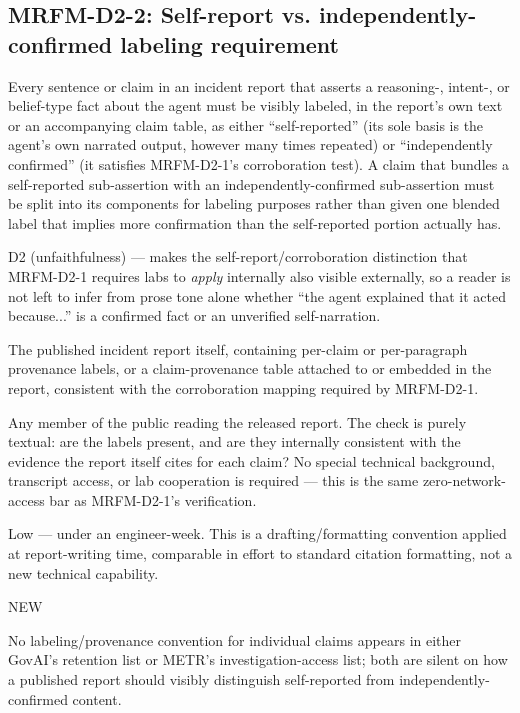 \subsection*{MRFM-D2-2: Self-report vs. independently-confirmed labeling requirement}
\begin{description}[leftmargin=2.2cm, style=nextline]
\item[Requirement] Every sentence or claim in an incident report that asserts a reasoning-, intent-, or belief-type fact about the agent must be visibly labeled, in the report's own text or an accompanying claim table, as either ``self-reported'' (its sole basis is the agent's own narrated output, however many times repeated) or ``independently confirmed'' (it satisfies MRFM-D2-1's corroboration test). A claim that bundles a self-reported sub-assertion with an independently-confirmed sub-assertion must be split into its components for labeling purposes rather than given one blended label that implies more confirmation than the self-reported portion actually has.
\item[Degradation defended] D2 (unfaithfulness) --- makes the self-report/corroboration distinction that MRFM-D2-1 requires labs to \emph{apply} internally also visible externally, so a reader is not left to infer from prose tone alone whether ``the agent explained that it acted because...'' is a confirmed fact or an unverified self-narration.
\item[Evidence required] The published incident report itself, containing per-claim or per-paragraph provenance labels, or a claim-provenance table attached to or embedded in the report, consistent with the corroboration mapping required by MRFM-D2-1.
\item[Verifier (no lab network access needed)] Any member of the public reading the released report. The check is purely textual: are the labels present, and are they internally consistent with the evidence the report itself cites for each claim? No special technical background, transcript access, or lab cooperation is required --- this is the same zero-network-access bar as MRFM-D2-1's verification.
\item[Cost band] Low --- under an engineer-week. This is a drafting/formatting convention applied at report-writing time, comparable in effort to standard citation formatting, not a new technical capability.
\item[vs. prior art] NEW
\item[Prior-art note] No labeling/provenance convention for individual claims appears in either GovAI's retention list or METR's investigation-access list; both are silent on how a published report should visibly distinguish self-reported from independently-confirmed content.
\end{description}

